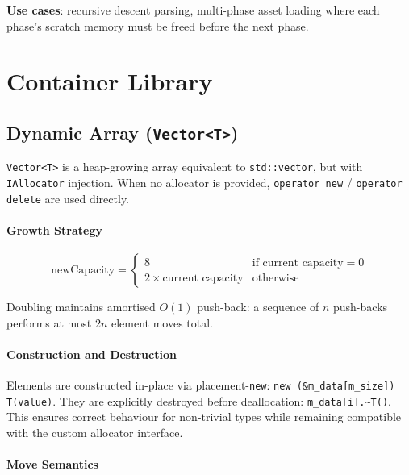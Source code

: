 \documentclass[12pt, a4paper]{report}
\theoremstyle{definition}
\theoremstyle{remark}
\begin{document}
\textbf{Use cases}: recursive descent parsing, multi-phase asset loading
where each phase's scratch memory must be freed before the next phase.

\chapter{Container Library}

\section{Dynamic Array (\texttt{Vector<T>})}

\texttt{Vector<T>} is a heap-growing array equivalent to \texttt{std::vector},
but with \texttt{IAllocator} injection. When no allocator is provided,
\texttt{operator new} / \texttt{operator delete} are used directly.

\subsubsection{Growth Strategy}

\begin{equation}
\text{newCapacity} =
\begin{cases}
  8 & \text{if current capacity} = 0 \\
  2 \times \text{current capacity} & \text{otherwise}
\end{cases}
\end{equation}

Doubling maintains amortised $O(1)$ push-back: a sequence of $n$
push-backs performs at most $2n$ element moves total.

\subsubsection{Construction and Destruction}

Elements are constructed in-place via placement-\texttt{new}:
\texttt{new (\&m\_data[m\_size]) T(value)}.
They are explicitly destroyed before deallocation:
\texttt{m\_data[i].\textasciitilde T()}.
This ensures correct behaviour for non-trivial types while remaining
compatible with the custom allocator interface.

\subsubsection{Move Semantics}
\end{document}
